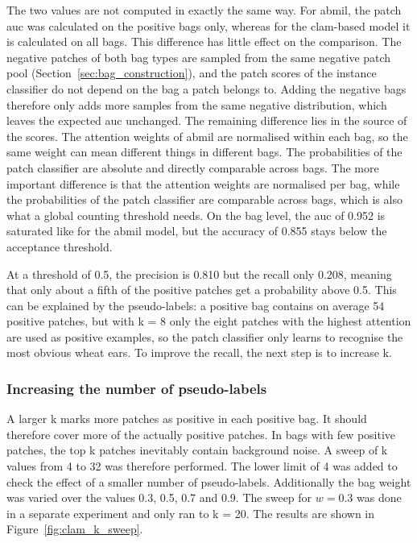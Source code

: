 \documentclass[12pt,parskip = half, DIV=classic,listof=totoc]{scrartcl}
\begin{document}
			The two values are not computed in exactly the same way. For \ac{abmil}, the patch \ac{auc} was calculated 
			on the positive bags only, whereas for the \acs*{clam}-based model it is calculated on all bags. 
			This difference has little effect on the comparison. The negative patches of both bag types are 
			sampled from the same negative patch pool (Section~\ref{sec:bag_construction}), and the patch scores of the instance 
			classifier do not depend on the bag a patch belongs to. Adding the negative bags therefore 
			only adds more samples from the same negative distribution, which leaves the expected \ac{auc} unchanged. 
			The remaining difference lies in the source of the scores. The attention weights of \ac{abmil} are normalised 
			within each bag, so the same weight can mean different things in different bags. The probabilities of the 
			patch classifier are absolute and directly comparable across bags. The more important difference is that 
			the attention weights are normalised per bag, while the probabilities of the patch classifier are 
			comparable across bags, which is also what a global counting threshold needs.
			On the bag level, the \ac{auc} of 0.952 is saturated like for the \ac{abmil} model, 
			but the accuracy of 0.855 stays below the acceptance threshold.

			At a threshold of 0.5, the precision is 0.810 but the recall only 0.208, meaning that only about a 
			fifth of the positive patches get a probability above 0.5. This can be explained by the pseudo-labels: 
			a positive bag contains on average 54 positive patches, but with k = 8 only the eight patches with the 
			highest attention are used as positive examples, so the patch classifier only learns to recognise the 
			most obvious wheat ears. To improve the recall, the next step is to increase k.

			\subsubsection{Increasing the number of pseudo-labels}\label{sec:clam_k_opt}
			A larger k marks more patches as positive in each positive bag. It should
			therefore cover more of the actually positive patches. In bags with few positive patches,
			the top k patches inevitably contain background noise. A sweep of k values from 4 to 32 was therefore performed.
			The lower limit of 4 was added to check the effect of a smaller number of pseudo-labels. Additionally the bag weight was 
			varied over the values 0.3, 0.5, 0.7 and 0.9. The sweep for $w = 0.3$ was done in a separate experiment and only ran to k = 20. 
			The results are shown in Figure~\ref{fig:clam_k_sweep}.
\end{document}
